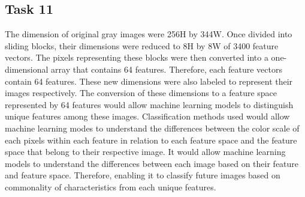 \documentclass{article}
\begin{document}
\begin{multicols}{2}
	\section{Task 11}
	The dimension of original gray images were 256H by 344W. Once divided into sliding blocks, their dimensions were reduced to 8H by 8W of 3400 feature vectors. The pixels representing these blocks were then converted into a one-dimensional array that contains 64 features. Therefore, each feature vectors contain 64 features. These new dimensions were also labeled to represent their images respectively. The conversion of these dimensions to a feature space represented by 64 features would allow machine learning models to distinguish unique features among these images. Classification methods used would allow machine learning modes to understand the differences between the color scale of each pixels within each feature in relation to each feature space and the feature space that belong to their respective image. It would allow machine learning models to understand the differences between each image based on their feature and feature space. Therefore, enabling it to classify future images based on commonality of characteristics from each unique features. 
\end{multicols}
\end{document}
